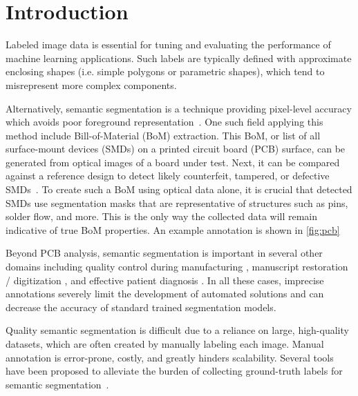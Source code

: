 \section{Introduction}
Labeled image data is essential for tuning and evaluating the performance of machine learning applications.
Such labels are typically defined with approximate enclosing shapes (i.e. simple polygons or parametric shapes), which tend to misrepresent more complex components.

Alternatively, semantic segmentation is a technique providing pixel-level accuracy which avoids poor foreground representation~\cite{chengSurveyAnalysisAutomatic2018}.
One such field applying this method include Bill-of-Material (BoM) extraction. This BoM, or list of all surface-mount devices (SMDs) on a printed circuit board (PCB) surface, can be generated from optical images of a board under test. Next, it can be compared against a reference design to detect likely counterfeit, tampered, or defective SMDs~\cite{paradis2020color,azhaganReviewAutomaticBill2019}. To create such a BoM using optical data alone, it is crucial that detected SMDs use segmentation masks that are representative of structures such as pins, solder flow, and more. This is the only way the collected data will remain indicative of true BoM properties. An example annotation is shown in \autoref{fig:pcb}

\makePcbFig

Beyond PCB analysis, semantic segmentation is important in several other domains including quality control during manufacturing \cite{fergusonDetectionSegmentationManufacturing2018,anagnostopoulosComputerVisionApproach2001,anagnostopoulosHighPerformanceComputing2002}, manuscript restoration / digitization \cite{gatosSegmentationfreeRecognitionTechnique2004,kesimanNewSchemeText2016,jainTextSegmentationUsing1992,taxtSegmentationDocumentImages1989,fujisawaSegmentationMethodsCharacter1992}, and effective patient diagnosis \cite{seifertSemanticAnnotationMedical2010,rajchlDeepCutObjectSegmentation2017,yushkevichUserguided3DActive2006,iakovidisRatsnakeVersatileImage2014}.
In all these cases, imprecise annotations severely limit the development of automated solutions and can decrease the accuracy of standard trained segmentation models.

Quality semantic segmentation is difficult due to a reliance on large, high-quality datasets, which are often created by manually labeling each image.
Manual annotation is error-prone, costly, and greatly hinders scalability.
Several tools have been proposed to alleviate the burden of collecting ground-truth labels for semantic segmentation~\cite{BestImageAnnotation}.

